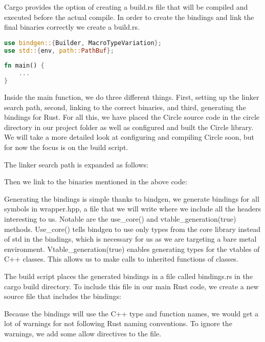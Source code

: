 Cargo provides the option of creating a build.rs file that will be compiled and executed before the actual compile.
In order to create the bindings and link the final binaries correctly we create a build.rs.
\begin{lstlisting}[language=Rust,style=colouredRust]
use bindgen::{Builder, MacroTypeVariation};
use std::{env, path::PathBuf};
    
fn main() {
    ...
}    
\end{lstlisting}

Inside the main function, we do three different things.
First, setting up the linker search path, second, linking to the correct binaries, and third, generating the bindings for Rust.
For all this, we have placed the Circle source code in the circle directory in our project folder as well as configured and built the Circle library.
We will take a more detailed look at configuring and compiling Circle soon, but for now the focus is on the build script.

The linker search path is expanded as follows:


Then we link to the binaries mentioned in the above code:


Generating the bindings is simple thanks to bindgen, we generate bindings for all symbols in wrapper.hpp,
a file that we will write where we include all the headers interesting to us.
Notable are the use\_core() and vtable\_generation(true) methods.
Use\_core() tells bindgen to use only types from the core library instead of std in the bindings, which is necessary for us as we are targeting a bare metal environment.
Vtable\_generation(true) enables generating types for the vtables of C++ classes.
This allows us to make calls to inherited functions of classes.


The build script places the generated bindings in a file called bindings.rs in the cargo build directory.
To include this file in our main Rust code, we create a new source file that includes the bindings:


Because the bindings will use the C++ type and function names, we would get a lot of warnings for not following Rust naming conventions.
To ignore the warnings, we add some allow directives to the file.

